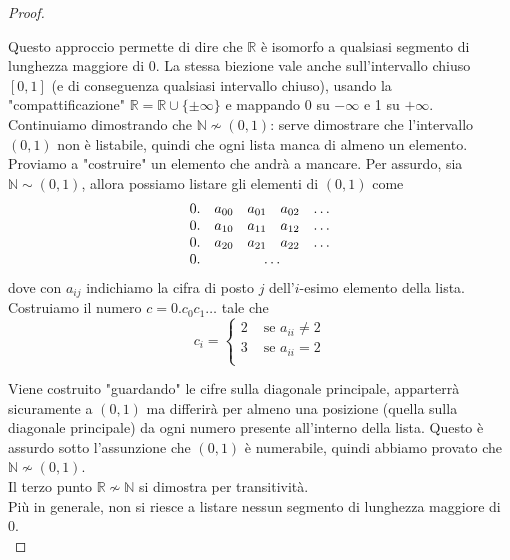 \begin{proof}
\begin{center}
	\end{center}
	
	Questo approccio permette di dire che $\mathbb{R}$ è isomorfo a qualsiasi segmento di lunghezza maggiore di $0$. La stessa biezione vale anche sull'intervallo chiuso $[0,1]$ (e di conseguenza qualsiasi intervallo chiuso), usando la "compattificazione" $\mathbb{R} = \mathbb{R} \cup \{\pm \infty\}$ e mappando $0$ su $-\infty$ e 1 su $+ \infty$.\\
	
	Continuiamo dimostrando che $\mathbb{N} \nsim (0,1)$: serve dimostrare che l'intervallo $(0,1)$ non è listabile, quindi che ogni lista manca di almeno un elemento. Proviamo a "costruire" un elemento che andrà a mancare. Per assurdo, sia $\mathbb{N} \sim (0,1)$, allora possiamo listare gli elementi di $(0,1)$ come 
	$$ 
	\begin{array}{c c c c c}
		0. & a_{00} & a_{01} & a_{02} & \dots \\
		0. & a_{10} & a_{11} & a_{12} & \dots \\
		0. & a_{20} & a_{21} & a_{22} & \dots \\
		0. & \multicolumn{4}{c}{\dots}
	\end{array}
	$$
	dove con $a_{ij}$ indichiamo la cifra di posto $j$ dell'$i$-esimo elemento della lista.\\
	
	Costruiamo il numero $c = 0.c_0 c_1 \dots$ tale che
	$$ c_{i} = \begin{cases}
		2 & \text{ se } a_{ii} \neq 2 \\
		3 & \text{ se } a_{ii} = 2 \\
	\end{cases}$$
	
	Viene costruito "guardando" le cifre sulla diagonale principale, apparterrà sicuramente a $(0,1)$ ma differirà per almeno una posizione (quella sulla diagonale principale) da ogni numero presente all'interno della lista. Questo è assurdo sotto l'assunzione che $(0,1)$ è numerabile, quindi abbiamo provato che $\mathbb{N} \nsim (0,1)$.\\
	
	Il terzo punto $\mathbb{R} \nsim \mathbb{N}$ si dimostra per transitività.\\
	
	Più in generale, non si riesce a listare nessun segmento di lunghezza maggiore di 0.\\
\end{proof}

